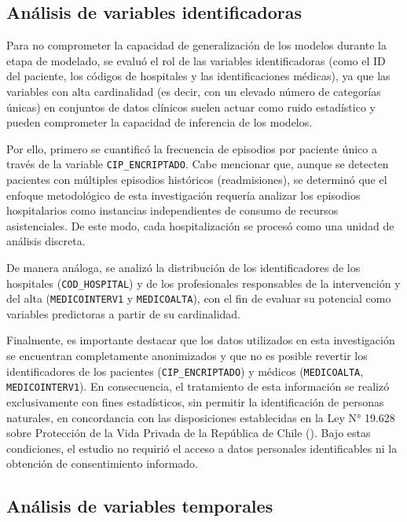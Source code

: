 \subsection{Análisis de variables identificadoras}

Para no comprometer la capacidad de generalización de los modelos durante la etapa de modelado, se evaluó el rol de las variables identificadoras (como el ID del paciente, los códigos de hospitales y las identificaciones médicas), ya que las variables con alta cardinalidad (es decir, con un elevado número de categorías únicas) en conjuntos de datos clínicos suelen actuar como ruido estadístico y pueden comprometer la capacidad de inferencia de los modelos.

Por ello, primero se cuantificó la frecuencia de episodios por paciente único a través de la variable \texttt{CIP\_ENCRIPTADO}. Cabe mencionar que, aunque se detecten pacientes con múltiples episodios históricos (readmisiones), se determinó que el enfoque metodológico de esta investigación requería analizar los episodios hospitalarios como instancias independientes de consumo de recursos asistenciales. De este modo, cada hospitalización se procesó como una unidad de análisis discreta.

De manera análoga, se analizó la distribución de los identificadores de los hospitales (\texttt{COD\_HOSPITAL}) y de los profesionales responsables de la intervención y del alta (\texttt{MEDICOINTERV1} y \texttt{MEDICOALTA}), con el fin de evaluar su potencial como variables predictoras a partir de su cardinalidad.

Finalmente, es importante destacar que los datos utilizados en esta investigación se encuentran completamente anonimizados y que no es posible revertir los identificadores de los pacientes (\texttt{CIP\_ENCRIPTADO}) y médicos (\texttt{MEDICOALTA}, \texttt{MEDICOINTERV1}). En consecuencia, el tratamiento de esta información se realizó exclusivamente con fines estadísticos, sin permitir la identificación de personas naturales, en concordancia con las disposiciones establecidas en la Ley N° 19.628 sobre Protección de la Vida Privada de la República de Chile (\cite{ley19628}). Bajo estas condiciones, el estudio no requirió el acceso a datos personales identificables ni la obtención de consentimiento informado.

\subsection{Análisis de variables temporales}

